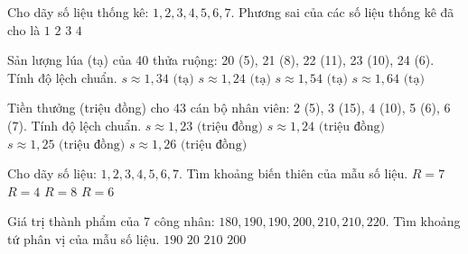 \begin{ex}
	Cho dãy số liệu thống kê: $1, 2, 3, 4, 5, 6, 7$. Phương sai của các số liệu thống kê đã cho là
	\choice
	{$1$}
	{$2$}
	{$3$}
	{\True $4$}
\end{ex}

\begin{ex}
	Sản lượng lúa (tạ) của 40 thửa ruộng: 20 (5), 21 (8), 22 (11), 23 (10), 24 (6). Tính độ lệch chuẩn.
	\choice
	{$s \approx 1{,}34\text{ (tạ)}$}
	{\True $s \approx 1{,}24\text{ (tạ)}$}
	{$s \approx 1{,}54\text{ (tạ)}$}
	{$s \approx 1{,}64\text{ (tạ)}$}
\end{ex}

\begin{ex}
	Tiền thưởng (triệu đồng) cho 43 cán bộ nhân viên: 2 (5), 3 (15), 4 (10), 5 (6), 6 (7). Tính độ lệch chuẩn.
	\choice
	{$s \approx 1{,}23\text{ (triệu đồng)}$}
	{$s \approx 1{,}24\text{ (triệu đồng)}$}
	{$s \approx 1{,}25\text{ (triệu đồng)}$}
	{\True $s \approx 1{,}26\text{ (triệu đồng)}$}
\end{ex}

\begin{ex}
	Cho dãy số liệu: $1, 2, 3, 4, 5, 6, 7$. Tìm khoảng biến thiên của mẫu số liệu.
	\choice
	{$R = 7$}
	{$R = 4$}
	{$R = 8$}
	{\True $R = 6$}
\end{ex}

\begin{ex}
	Giá trị thành phẩm của 7 công nhân: $180, 190, 190, 200, 210, 210, 220$. Tìm khoảng tứ phân vị của mẫu số liệu.
	\choice
	{$190$}
	{\True $20$}
	{$210$}
	{$200$}
\end{ex}

